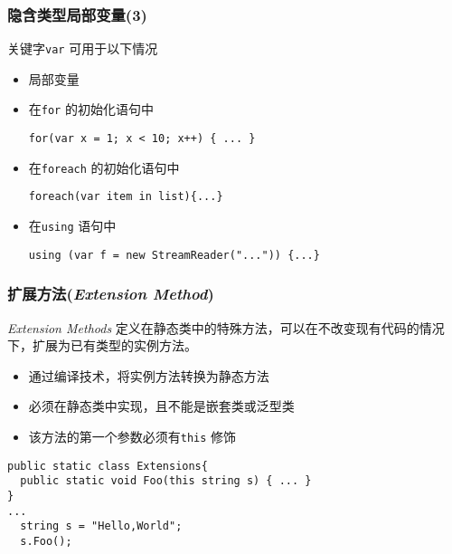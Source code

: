 \begin{frame}[fragile]
\frametitle{隐含类型局部变量(3)}

关键字\texttt{var} 可用于以下情况
\begin{itemize}[<+->]
\item 局部变量
\item 在\texttt{for} 的初始化语句中
\begin{lstlisting}
for(var x = 1; x < 10; x++) { ... }
\end{lstlisting}
\item 在\texttt{foreach} 的初始化语句中
\begin{lstlisting}
foreach(var item in list){...}
\end{lstlisting}
\item 在\texttt{using} 语句中
\begin{lstlisting}
using (var f = new StreamReader("...")) {...}
\end{lstlisting}
\end{itemize}
\end{frame}


\begin{frame}[fragile]
\frametitle{扩展方法(\textit{Extension Method})}
\begin{block}{\textit{Extension Methods}}
\CJKindent 定义在静态类中的特殊方法，可以在不改变现有代码的情况下，扩展为已有类型的实例方法。
\end{block}

\begin{itemize}
\item 通过编译技术，将实例方法转换为静态方法
\item 必须在静态类中实现，且不能是嵌套类或泛型类
\item 该方法的第一个参数必须有\texttt{this} 修饰
\end{itemize}

\begin{lstlisting}
public static class Extensions{
  public static void Foo(this string s) { ... }
}
...
  string s = "Hello,World";
  s.Foo();
\end{lstlisting}
\end{frame}


